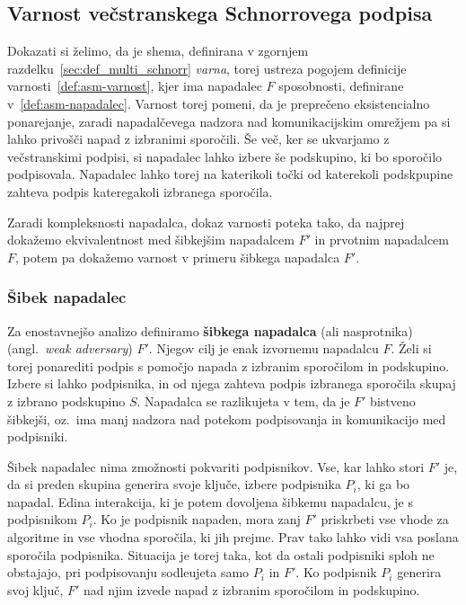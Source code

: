 \documentclass[isrm2, tisk]{fmfdelo}
\begin{document}
\subsection{Varnost večstranskega Schnorrovega podpisa}
\label{sec:proof_multi_schnorr}
Dokazati si želimo, da je shema, definirana v zgornjem razdelku~\ref{sec:def_multi_schnorr} \textit{varna},
torej ustreza pogojem definicije varnosti~\ref{def:asm-varnost}, kjer ima napadalec $F$ sposobnosti,
definirane v~\ref{def:asm-napadalec}. Varnost torej pomeni, da je preprečeno eksistencialno ponarejanje,
zaradi napadalčevega nadzora nad komunikacijskim omrežjem pa si lahko privošči napad z izbranimi sporočili.
Še več, ker se ukvarjamo z večstranskimi podpisi, si napadalec lahko izbere še podskupino, ki bo 
sporočilo podpisovala. Napadalec lahko torej na katerikoli točki od katerekoli podskpupine zahteva
podpis kateregakoli izbranega sporočila.

Zaradi kompleksnosti napadalca, dokaz varnosti poteka tako, da najprej dokažemo ekvivalentnost med
šibkejšim napadalcem $F'$ in prvotnim napadalcem $F$, potem pa dokažemo varnost v primeru šibkega
napadalca $F'$.

\subsubsection{Šibek napadalec}
Za enostavnejšo analizo definiramo \textbf{šibkega napadalca} (ali nasprotnika) (angl.\ 
\textit{weak adversary}) $F'$. Njegov cilj je enak izvornemu napadalcu $F$. Želi si torej ponarediti podpis
s pomočjo napada z izbranim sporočilom in podskupino. Izbere si lahko podpisnika, in od njega
zahteva podpis izbranega sporočila skupaj z izbrano podskupino $S$. Napadalca se razlikujeta v tem,
da je $F'$ bistveno šibkejši, oz.\ ima manj nadzora nad potekom podpisovanja in komunikacijo med
podpisniki.

Šibek napadalec nima zmožnosti pokvariti podpisnikov. Vse, kar lahko stori $F'$ je, da si preden skupina
generira svoje ključe, izbere podpisnika $P_i$, ki ga bo napadal. Edina interakcija, ki je potem dovoljena
šibkemu napadalcu, je s podpisnikom $P_i$. Ko je podpisnik napaden, mora zanj $F'$ priskrbeti vse vhode
za algoritme in vse vhodna sporočila, ki jih prejme. Prav tako lahko vidi vsa poslana sporočila
podpisnika. Situacija je torej taka, kot da ostali podpisniki sploh ne obstajajo, pri podpisovanju 
sodleujeta samo $P_i$ in $F'$. Ko podpisnik $P_i$ generira svoj ključ, $F'$ nad njim izvede napad z izbranim 
sporočilom in podskupino.
\end{document}
